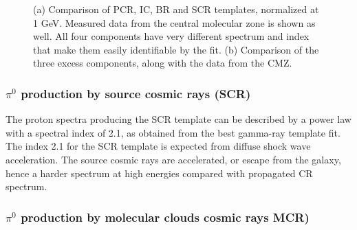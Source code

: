 \begin{figure}[h]
\begin{minipage}[h]{0.45\textwidth}
 	  \subcaption{}
 	  \label{fig:norm_excess_component}
  \end{minipage}
  \caption{(a) Comparison of PCR, IC, BR and SCR templates, normalized at 1 GeV. Measured data from the central molecular zone is shown as well. All four components have very different spectrum and index that make them easily identifiable by the fit. (b) Comparison of the three excess components, along with the data from the CMZ.}
  \label{fig:norm_spectra} 
\end{figure}




%

\subsubsection{$\pi^0$ production by source cosmic rays (SCR)}

The proton spectra producing the SCR template can be described by a power law with a spectral index of 2.1, as obtained from the best gamma-ray template fit. The index 2.1 for the SCR template %
is expected from diffuse shock wave acceleration. %
The source cosmic rays are accelerated, or escape from the galaxy, hence a harder spectrum at high energies compared with propagated CR spectrum.


\subsubsection{$\pi^0$ production by molecular clouds cosmic rays MCR)}

